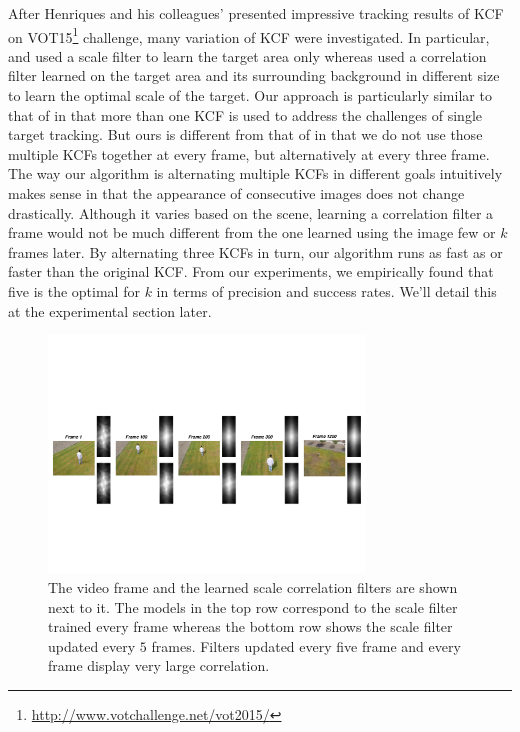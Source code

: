 \documentclass{bmvc2k}
\begin{document}
After Henriques and his colleagues' presented impressive tracking 
results of KCF \cite{henriques2015high} on
VOT15\footnote{\url{http://www.votchallenge.net/vot2015/}} challenge,
many variation of KCF were investigated. In particular,
\cite{ma2015long} and \cite{danelljan2014accurate} used a scale filter
to learn the target area only whereas \cite{li2014scale,
  bibi2015multi, tang2015multi} used a correlation filter learned on
the target area and its surrounding background in different size to
learn the optimal scale of the target. Our approach is particularly
similar to that of \cite{ma2015long} in that more than one KCF is used
to address the challenges of single target tracking. But ours is
different from that of \cite{ma2015long} in that we do not use those
multiple KCFs together at every frame, but alternatively at every
three frame. The way our algorithm is alternating multiple KCFs in
different goals intuitively makes sense in that the appearance of
consecutive images does not change drastically. Although it varies
based on the scene, learning a correlation filter a frame would not be
much different from the one learned using the image few or $k$ frames
later. By alternating three KCFs in turn, our algorithm runs as fast
as or faster than the original KCF. From our experiments, we
empirically found that five is the optimal for $k$ in terms of
precision and success rates. We'll detail this at the experimental
section later.

\begin{figure}[!h]
\centering
\includegraphics[width=0.75\textwidth]{figures/LearnedFilterComparison.pdf}
\caption{The video frame and the learned scale correlation filters are shown next to it. 
The models in the top row correspond to the scale filter trained every frame whereas the bottom row shows the scale filter updated every $5$ frames. 
Filters updated every five frame and every frame display very large correlation.}
\label{fig:Filters_Comparison}
\end{figure}
\end{document}
